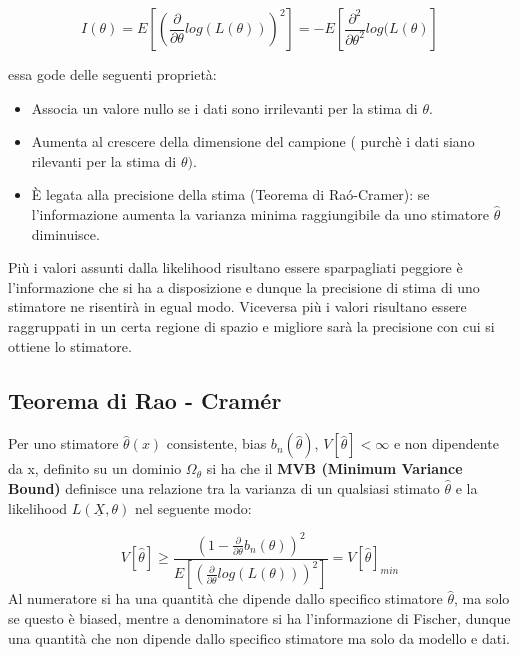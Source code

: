 \documentclass[11pt,a4paper]{book}
\begin{document}
\begin{equation*}
		I(\theta) = E[(\frac{\partial}{\partial \theta}log(L(\theta)))^2] = -E[\frac{\partial^2}{\partial\theta^2}log(L(\theta)]
\end{equation*}

\noindent essa gode delle seguenti propriet\`{a}:

\begin{itemize}
	\item Associa un valore nullo se i dati sono irrilevanti per la stima di $\theta$.
	\item Aumenta al crescere della dimensione del campione ( purch\`{e} i dati siano rilevanti per la stima di $\theta)$.
	\item \`{E} legata alla precisione della stima (Teorema di Ra\'{o}-Cramer): se l'informazione aumenta la varianza minima raggiungibile da uno stimatore $\hat{\theta}$ diminuisce.
\end{itemize}

\noindent Pi\`{u} i valori assunti dalla likelihood risultano essere sparpagliati peggiore \`{e} l'informazione che si ha a disposizione e dunque la precisione di stima di uno stimatore ne risentir\`{a} in egual modo. Viceversa pi\`{u} i valori risultano essere raggruppati in un certa regione di spazio e migliore sar\`{a} la precisione con cui si ottiene lo stimatore.

\subsection{Teorema di Rao - Cram\'{e}r}

Per uno stimatore $\hat{\theta}(x)$ consistente, bias $b_n(\hat{\theta})$, $V[\hat{\theta}] < \infty$ e non dipendente da x, definito su un dominio $\Omega_{\theta}$ si ha che il \textbf{MVB (Minimum Variance Bound)} definisce una relazione tra la varianza di un qualsiasi stimato $\hat{\theta}$ e la likelihood $L(\underline{X},\theta)$ nel seguente modo:

\begin{equation}
	V[\hat{\theta}] \geq \frac{(1-\frac{\partial}{\partial \theta}b_n(\theta))^2}{E[(\frac{\partial}{\partial \theta}log(L(\theta)))^2]} = V[\hat{\theta}]_{min}
\end{equation}
\newline
\noindent Al numeratore si ha una quantit\`{a} che dipende dallo specifico stimatore $\hat{\theta}$, ma solo se questo \`{e} biased, mentre a denominatore si ha l'informazione di Fischer, dunque una quantit\`{a} che non dipende dallo specifico stimatore ma solo da modello e dati.
\newline
\end{document}
